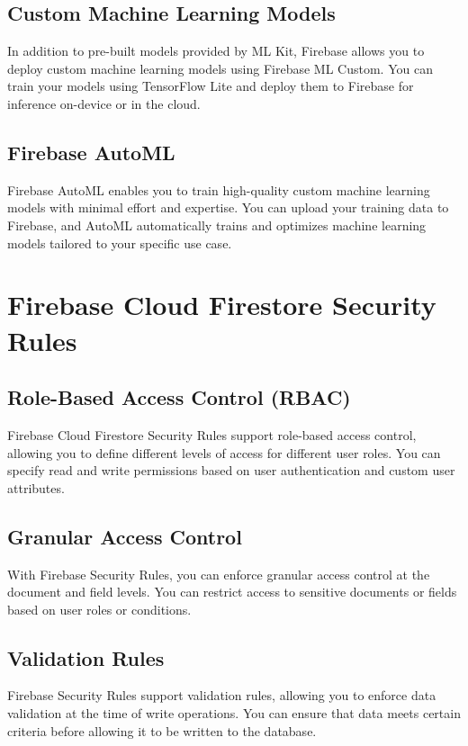 \documentclass[12pt]{article}
\begin{document}
\subsection{Custom Machine Learning Models}
In addition to pre-built models provided by ML Kit, Firebase allows you to deploy custom machine learning models using Firebase ML Custom. You can train your models using TensorFlow Lite and deploy them to Firebase for inference on-device or in the cloud.

\subsection{Firebase AutoML}
Firebase AutoML enables you to train high-quality custom machine learning models with minimal effort and expertise. You can upload your training data to Firebase, and AutoML automatically trains and optimizes machine learning models tailored to your specific use case.

\section{Firebase Cloud Firestore Security Rules}

\subsection{Role-Based Access Control (RBAC)}
Firebase Cloud Firestore Security Rules support role-based access control, allowing you to define different levels of access for different user roles. You can specify read and write permissions based on user authentication and custom user attributes.

\subsection{Granular Access Control}
With Firebase Security Rules, you can enforce granular access control at the document and field levels. You can restrict access to sensitive documents or fields based on user roles or conditions.

\subsection{Validation Rules}
Firebase Security Rules support validation rules, allowing you to enforce data validation at the time of write operations. You can ensure that data meets certain criteria before allowing it to be written to the database.
\end{document}
